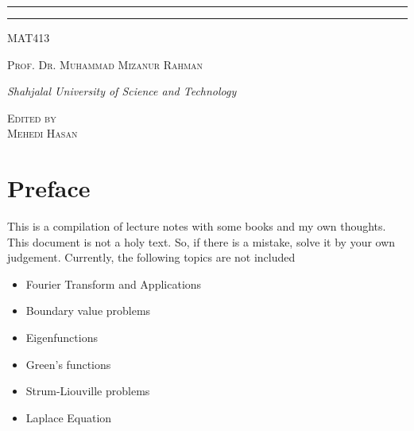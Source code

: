 \documentclass[12pt]{book}
\newcommand{\course}{MAT413}
\newcommand{\prof}{Prof. Dr. Muhammad Mizanur Rahman}
\begin{document}
\begin{titlepage}
\rule{345pt}{0.4pt}\vspace*{-\baselineskip}\vspace{3.2pt}
\rule{345pt}{1.6pt}

\vspace{2\baselineskip}

{\scshape \Large{\course}} 

\vspace*{5\baselineskip}



\vspace{0.5\baselineskip} 

{\scshape   \Large \prof\\ }

\vspace{0.75\baselineskip} 

{\textit{\large Shahjalal University of Science and Technology}} 

\vfill 

\vspace{0.3\baselineskip} 


{\scshape \large Edited by\\  Mehedi Hasan} 
\vspace*{40pt}
\end{titlepage}
\newpage
\section*{Preface}
This is a compilation of lecture notes with some books and my own thoughts. This document is not a holy text. So, if there is a mistake, solve it by your own judgement. Currently, the following topics are not included
\begin{itemize}
    \item Fourier Transform and Applications
    \item Boundary value problems
    \item Eigenfunctions
    \item Green's functions
    \item Strum-Liouville problems
    \item Laplace Equation
\end{itemize}

\newpage
\tableofcontents
\newpage
{}
\end{document}

